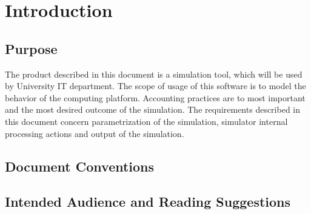 
\chapter{Introduction}

\section{Purpose}
	\begin{comment}
	$<$Identify the product whose software requirements are specified in this 
	document, including the revision or release number. Describe the scope of the 
	product that is covered by this SRS, particularly if this SRS describes only 
	part of the system or a single subsystem.$>$
	\end{comment}
	The product described in this document is a simulation tool, which will be used by University IT department. The scope of usage of this software is to model the behavior of the computing platform. Accounting practices are to most important and the most desired outcome of the simulation. The requirements described in this document concern parametrization of the simulation, simulator internal processing actions and output of the simulation.
\section{Document Conventions}
	\begin{comment}
		$<$Describe any standards or typographical conventions that were followed when 
		writing this SRS, such as fonts or highlighting that have special significance.  
		For example, state whether priorities  for higher-level requirements are assumed 
		to be inherited by detailed requirements, or whether every requirement statement 
		is to have its own priority.$>$
	\end{comment}
\section{Intended Audience and Reading Suggestions}
	\begin{comment}
		$<$Describe the different types of reader that the document is intended for, 
		such as developers, project managers, marketing staff, users, testers, and 
		documentation writers. Describe what the rest of this SRS contains and how it is 
		organized. Suggest a sequence for reading the document, beginning with the 
		overview sections and proceeding through the sections that are most pertinent to 
		each reader type.$>$
	\end{comment}
